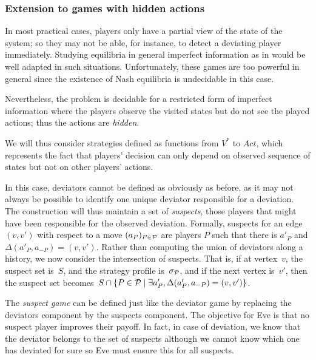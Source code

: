 \subsubsection{Extension to games with hidden
actions}\label{extension-to-games-with-hidden-actions}
In most practical cases, players only have a partial view of the
state of the system; so they may not be able, for instance, to
detect a deviating player immediately.
Studying equilibria in general imperfect information as in  
would be well adapted in such situations.
Unfortunately, these games are too powerful in general since
the existence of Nash equilibria is undecidable in this case.

Nevertheless, the problem is decidable for a restricted form of imperfect
information where the players observe the visited states
but do not see the played actions; thus the actions are \emph{hidden}.

We will thus consider strategies defined as functions from \(V^*\) to \(Act\),
which represents the fact that players' decision can only depend on observed
sequence of states but not on other players' actions.

In this case, deviators cannot be defined as obviously as before, as it may
not always be possible to identify one unique deviator responsible for a
deviation. The construction will thus maintain a set of \emph{suspects}, those players that might have been
responsible for the observed deviation.
Formally, suspects for an edge \((v, v')\) with respect to a move
\((a_P)_{P\in \mathcal{P}}\) are players \(P\) such that there is \(a'_P\) and
\(\Delta(a'_P, a_{-P}) = (v, v')\). Rather than computing the
union of deviators along a history, we now consider the intersection of
suspects. That is, if at vertex~$v$, the suspect set is~$S$, and the strategy profile is~$\sigma_{\mathcal{P}}$,
and if the next vertex is~$v'$, then
the suspect set becomes~$S \cap \{ P \in \mathcal{P} \mid \exists a'_P, \Delta(a'_P, a_{-P}) = (v, v')\}$.


The \emph{suspect game} can be defined just like the deviator game by replacing the deviators component
by the suspects component.
The objective for Eve is that no suspect player improves their payoff. In fact, in
case of deviation, we know that the deviator belongs to the set of suspects although
we cannot know which one has deviated for sure so Eve must ensure this for all suspects.

